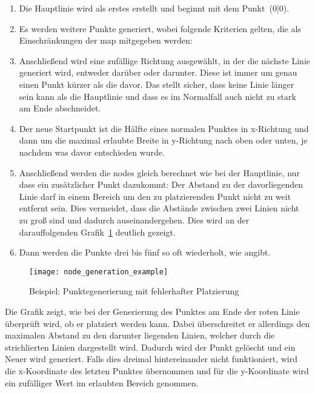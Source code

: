 \begin{enumerate}
    \item Die Hauptlinie wird als erstes erstellt und beginnt mit dem Punkt~(0|0).
    \item Es werden  weitere Punkte generiert, wobei folgende Kriterien gelten, die als Einschränkungen der map mitgegeben werden:
    \item Anschließend wird eine zufällige Richtung ausgewählt, in der die nächste Linie generiert wird, entweder darüber oder darunter.
    Diese ist immer um genau einen Punkt kürzer als die davor.
    Das stellt sicher, dass keine Linie länger sein kann als die Hauptlinie und dass es im Normalfall auch nicht zu stark am Ende abschneidet.
    \item Der neue Startpunkt ist die Hälfte eines normalen Punktes in x-Richtung und dann um die maximal erlaubte Breite in y-Richtung nach oben oder unten, je nachdem was davor entschieden wurde.
    \item Anschließend werden die nodes gleich berechnet wie bei der Hauptlinie, nur dass ein zusätzlicher Punkt dazukommt:
    Der Abstand zu der davorliegenden Linie darf in einem Bereich um den zu platzierenden Punkt nicht zu weit entfernt sein.
    Dies vermeidet, dass die Abstände zwischen zwei Linien nicht zu groß sind und dadurch auseinandergehen.
    Dies wird an der darauffolgenden Grafik~\ref{fig:point-generation} deutlich gezeigt.
    \item Dann werden die Punkte drei bis fünf so oft wiederholt, wie  angibt.
\end{enumerate}

\begin{figure}[H]
    \centering
    \texttt{[image: node\_generation\_example]}
    \caption{Beispiel: Punktegenerierung mit fehlerhafter Platzierung}\label{fig:point-generation}
\end{figure}
Die Grafik zeigt, wie bei der Generierung des Punktes am Ende der roten Linie überprüft wird, ob er platziert werden kann.
Dabei überschreitet er allerdings den maximalen Abstand zu den darunter liegenden Linien, welcher durch die strichlierten Linien dargestellt wird.
Dadurch wird der Punkt gelöscht und ein Neuer wird generiert.
Falls dies dreimal hintereinander nicht funktioniert, wird die x-Koordinate des letzten Punktes übernommen und für die y-Koordinate wird ein zufälliger Wert im erlaubten Bereich genommen.

